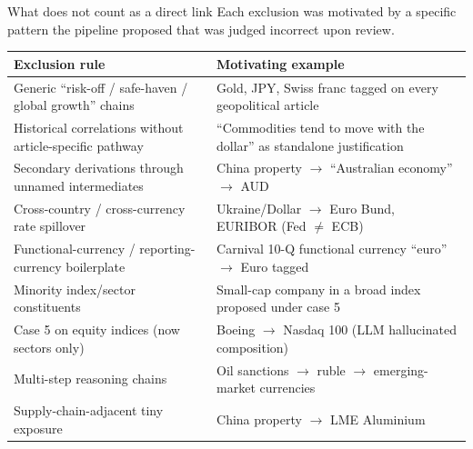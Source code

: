 \documentclass[10pt,aspectratio=169]{beamer}
\begin{document}
\begin{frame}{What does not count as a direct link}
  \scriptsize
  Each exclusion was motivated by a specific pattern the pipeline proposed
  that was judged incorrect upon review.

  \smallskip
  \begin{tabular}{@{}p{6.6cm}p{5.8cm}@{}}
    \toprule
    \textbf{Exclusion rule} & \textbf{Motivating example} \\
    \midrule
    Generic ``risk-off / safe-haven / global growth'' chains
      & Gold, JPY, Swiss franc tagged on every geopolitical article \\
    Historical correlations without article-specific pathway
      & ``Commodities tend to move with the dollar'' as standalone justification \\
    Secondary derivations through unnamed intermediates
      & China property $\to$ ``Australian economy'' $\to$ AUD \\
    Cross-country / cross-currency rate spillover
      & Ukraine/Dollar $\to$ Euro Bund, EURIBOR (Fed $\ne$ ECB) \\
    Functional-currency / reporting-currency boilerplate
      & Carnival 10-Q functional currency ``euro'' $\to$ Euro tagged \\
    Minority index/sector constituents
      & Small-cap company in a broad index proposed under case 5 \\
    Case 5 on equity indices (now sectors only)
      & Boeing $\to$ Nasdaq 100 (LLM hallucinated composition) \\
    Multi-step reasoning chains
      & Oil sanctions $\to$ ruble $\to$ emerging-market currencies \\
    Supply-chain-adjacent tiny exposure
      & China property $\to$ LME Aluminium \\
    \bottomrule
  \end{tabular}
\end{frame}
\end{document}
